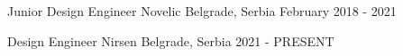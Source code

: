 


\begin{cventries}


\cventry
{Junior Design Engineer} %
{Novelic} %
{Belgrade, Serbia} %
{February 2018 - 2021} %
{ %
\begin{cvitems}
\item {}
\end{cvitems}
}


\cventry
{Design Engineer} %
{Nirsen} %
{Belgrade, Serbia} %
{2021 - PRESENT} %
{ %
\begin{cvitems}
\item
\end{cvitems}
}


\end{cventries}